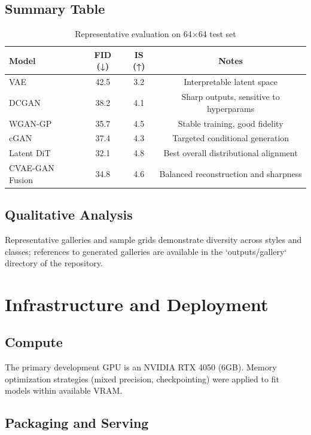 \documentclass[12pt,a4paper]{report}
\begin{document}
\section{Summary Table}

\begin{table}[h]
\centering
\caption{Representative evaluation on 64×64 test set}
\begin{tabularx}{0.9\textwidth}{lccc}
\toprule
Model & FID (↓) & IS (↑) & Notes \\
\midrule
VAE & 42.5 & 3.2 & Interpretable latent space \\
DCGAN & 38.2 & 4.1 & Sharp outputs, sensitive to hyperparams \\
WGAN-GP & 35.7 & 4.5 & Stable training, good fidelity \\
cGAN & 37.4 & 4.3 & Targeted conditional generation \\
Latent DiT & 32.1 & 4.8 & Best overall distributional alignment \\
CVAE-GAN Fusion & 34.8 & 4.6 & Balanced reconstruction and sharpness \\
\bottomrule
\end{tabularx}
\end{table}

\section{Qualitative Analysis}

Representative galleries and sample grids demonstrate diversity across styles and classes; references to generated galleries are available in the `outputs/gallery` directory of the repository.

\chapter{Infrastructure and Deployment}

\section{Compute}

The primary development GPU is an NVIDIA RTX 4050 (6GB). Memory optimization strategies (mixed precision, checkpointing) were applied to fit models within available VRAM.

\section{Packaging and Serving}
\end{document}
